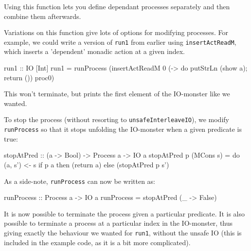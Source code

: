 \documentclass{article}
\begin{document}

Using this function lets you define dependant processes separately and then combine them afterwards. 

Variations on this function give lots of options for modifying processes. For example, we could write a version of \verb+run1+ from earlier using \verb+insertActReadM+, which inserts a 'dependent' monadic action at a given index.

\begin{haskell}
run1 :: IO [Int]
run1 = runProcess (insertActReadM 0 (\a -> 
	do putStrLn (show a); 
	   return ()) proc0)
\end{haskell}

This won't terminate, but prints the first element of the IO-monster like we wanted. 

To stop the process (without resorting to \verb+unsafeInterleaveIO+), we modify \verb+runProcess+ so that it stops unfolding the IO-monster when a given predicate is true:

\begin{haskell}
stopAtPred :: (a -> Bool) -> Process a -> IO a
stopAtPred p (MCons s) = do (a, s') <- s
                            if p a then (return a) else (stopAtPred p s')
\end{haskell}
 
As a side-note, \verb+runProcess+ can now be written as:
 
 \begin{haskell}
runProcess :: Process a -> IO a
runProcess = stopAtPred (\_ -> False)
\end{haskell}

It is now possible to terminate the process given a particular predicate. It is also possible to terminate a process at a particular index in the IO-monster, thus giving exactly the behaviour we wanted for \verb+run1+, without the unsafe IO (this is included in the example code, as it is a bit more complicated). \\
\end{document}
